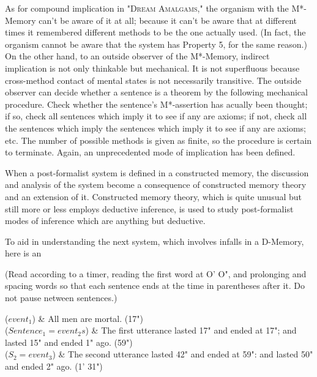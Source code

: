\documentclass[10pt,twoside]{memoir}
\begin{document}
\begin{enumerate}
{\begin{enumerate}
\begin{sysrules}
\begin{sysrules}
\begin{sysrules}
As for compound implication in "\textsc{Dream Amalgams,}" the organism 
with the M*-Memory can't be aware of it at all; because it can't be aware 
that at different times it remembered different methods to be the one 
actually used. (In fact, the organism cannot be aware that the system has 
Property 5, for the same reason.) On the other hand, to an outside observer 
of the M*-Memory, indirect implication is not only thinkable but 
mechanical. It is not superfluous because cross-method contact of mental 
states is not necessarily transitive. The outside observer can decide whether a 
sentence is a theorem by the following mechanical procedure. Check 
whether the sentence's M*-assertion has acually been thought; if so, check all 
sentences which imply it to see if any are axioms; if not, check all the 
sentences which imply the sentences which imply it to see if any are axioms; 
etc. The number of possible methods is given as finite, so the procedure is 
certain to terminate. Again, an unprecedented mode of implication has been 
defined. 

When a post-formalist system is defined in a constructed memory, the 
discussion and analysis of the system become a consequence of constructed 
memory theory and an extension of it. Constructed memory theory, which 
is quite unusual but still more or less employs deductive inference, is used to 
study post-formalist modes of inference which are anything but deductive. 

To aid in understanding the next system, which involves infalls in a 
D-Memory, here is an 

{ \centering \large {} \par}

(Read according to a timer, reading the first word at O' O", and prolonging 
and spacing words so that each sentence ends at the time in parentheses after 
it. Do not pause netween sentences.) 

\begin{tabular}
	($event_1$) &  All men are mortal. (17") \\

	($Sentence_1=event_2s$) &  The first utterance lasted 17" and ended at 17"; and lasted 15" and ended 1" ago. (59") \\

	($S_2=event_3$) & The second utterance lasted 42" and ended at 59": and lasted 50" and ended 2" ago. (1' 31") \\


\end{tabular}
\end{sysrules}
\end{sysrules}
\end{sysrules}
\end{enumerate}}
\end{enumerate}
\end{document}
